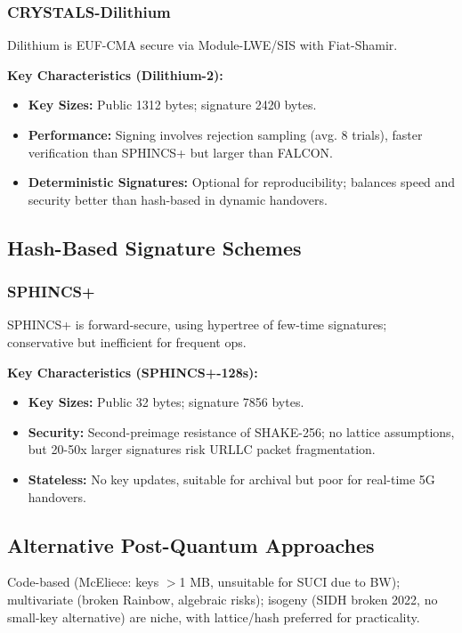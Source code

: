 \documentclass[11pt,a4paper]{article}
\begin{document}
\subsubsection{CRYSTALS-Dilithium}

Dilithium is EUF-CMA secure via Module-LWE/SIS with Fiat-Shamir.

\textbf{Key Characteristics (Dilithium-2):}
\begin{itemize}
    \item \textbf{Key Sizes:} Public 1312 bytes; signature 2420 bytes.
    \item \textbf{Performance:} Signing involves rejection sampling (avg. 8 trials), faster verification than SPHINCS+ but larger than FALCON.
    \item \textbf{Deterministic Signatures:} Optional for reproducibility; balances speed and security better than hash-based in dynamic handovers.
\end{itemize}

\subsection{Hash-Based Signature Schemes}

\subsubsection{SPHINCS+}

SPHINCS+ is forward-secure, using hypertree of few-time signatures; conservative but inefficient for frequent ops.

\textbf{Key Characteristics (SPHINCS+-128s):}
\begin{itemize}
    \item \textbf{Key Sizes:} Public 32 bytes; signature 7856 bytes.
    \item \textbf{Security:} Second-preimage resistance of SHAKE-256; no lattice assumptions, but 20-50x larger signatures risk URLLC packet fragmentation.
    \item \textbf{Stateless:} No key updates, suitable for archival but poor for real-time 5G handovers.
\end{itemize}

\subsection{Alternative Post-Quantum Approaches}

Code-based (McEliece: keys $>$1 MB, unsuitable for SUCI due to BW); multivariate (broken Rainbow, algebraic risks); isogeny (SIDH broken 2022, no small-key alternative) are niche, with lattice/hash preferred for practicality.
\end{document}
